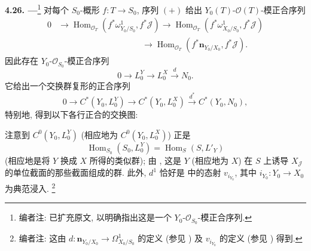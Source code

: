 \medskip
\noindent{}\textbf{4.26. ---}\footnote{编者注:
已扩充原文, 以明确指出这是一个 \(Y_0\)-\(\mathscr O_{S_0}\)-模正合序列.}
对每个 \(S_0\)-概形 \(f:T\to S_0\), 序列 \((+)\) 给出
\(Y_0(T)\)-\(\mathscr O(T)\)-模正合序列
\[
\begin{aligned}
0&\longrightarrow
 \operatorname{Hom}_{\mathscr O_T}
 \left(f^*\omega^1_{Y_0/S_0},f^*\mathscr J\right)
 \longrightarrow
 \operatorname{Hom}_{\mathscr O_T}
 \left(f^*\omega^1_{X_0/S_0},f^*\mathscr J\right)\\
&\hspace{10em}\longrightarrow
 \operatorname{Hom}_{\mathscr O_T}
 \left(f^*\mathbf n_{Y_0/X_0},f^*\mathscr J\right).
\end{aligned}
\]
因此存在 \(Y_0\)-\(\mathscr O_{S_0}\)-模正合序列
\[
 \tag{4.26.1}\label{sga3:iii:paragraph:4-26:equation:4-26-1}
 0\longrightarrow L_0^Y\longrightarrow L_0^X
 \xrightarrow{d}N_0.
\]
它给出一个交换群复形的正合序列
\[
 0\longrightarrow C^*(Y_0,L_0^Y)
 \longrightarrow C^*(Y_0,L_0^X)
 \xrightarrow{d^*}C^*(Y_0,N_0),
\]
特别地, 得到以下各行正合的交换图:

\begin{center}
\end{center}

注意到 \(C^0(Y_0,L_0^Y)\) (相应地为 \(C^0(Y_0,L_0^X)\)) 正是
\[
 \operatorname{Hom}_{S_0}(S_0,L_0^Y)
 =\operatorname{Hom}_{S}(S,L'_Y)
\]
(相应地是将 \(Y\) 换成 \(X\) 所得的类似群);
由 , 这是 \(Y\) (相应地为 \(X\))
在 \(S\) 上诱导 \(X_{\mathscr J}\) 的单位截面的那些截面组成的群.
此外, \(d^1\) 恰好是 
中的态射 \(v_{i_{Y_0}}\), 其中 \(i_{Y_0}:Y_0\to X_0\) 为典范浸入.
\footnote{编者注: 这由 \(d:\mathbf n_{Y_0/X_0}\to\Omega^1_{X_0/S_0}\)
的定义 (参见 ) 及 \(v_{i_{Y_0}}\)
的定义 (参见 ) 得到.}

